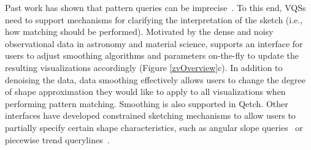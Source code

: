 Past work has shown that pattern queries 
can be imprecise~\cite{correll2016semantics,Holz2009,Eichmann2015}. 
To this end, VQSs need to support mechanisms for 
clarifying the interpretation of the sketch 
(i.e., how matching should be performed). 
Motivated by the dense and noisy observational data 
in astronomy and material science, 
\zvpp supports an interface for users to 
adjust smoothing algorithms and parameters on-the-fly 
to update the resulting visualizations accordingly (Figure \ref{zvOverview}c). 
In addition to denoising the data, 
data smoothing effectively allows users to 
change the degree of shape approximation 
they would like to apply to all visualizations 
when performing pattern matching. 
Smoothing is also supported in Qetch. 
Other interfaces have developed constrained 
sketching mechanisms to allow users to 
partially specify certain shape characteristics, 
such as angular slope queries~\cite{Hochheiser2004} or 
piecewise trend querylines~\cite{ryall2005querylines}. 

